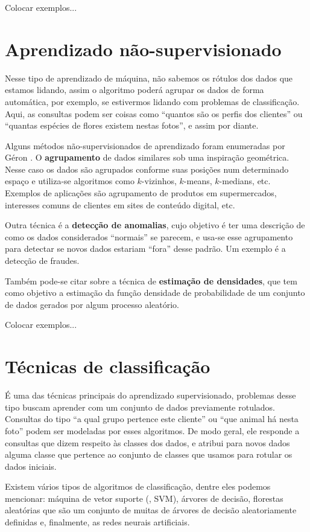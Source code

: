 Colocar exemplos...

\section{Aprendizado não-supervisionado}

Nesse tipo de aprendizado de máquina, não sabemos os rótulos dos dados que estamos lidando, assim o algoritmo poderá agrupar os dados de forma automática, por exemplo, se estivermos lidando com problemas de classificação. Aqui, as consultas podem ser coisas como ``quantos são os perfis dos clientes'' ou ``quantas espécies de flores existem nestas fotos'', e assim por diante.

Alguns métodos não-supervisionados de aprendizado foram enumeradas por Géron \citep{hands}. O \textbf{agrupamento} de dados similares sob uma inspiração geométrica. Nesse caso os dados são agrupados conforme suas posições num determinado espaço e utiliza-se algoritmos como $k$-vizinhos, $k$-means, $k$-medians, etc. Exemplos de aplicações são agrupamento de produtos em supermercados, interesses comuns de clientes em sites de conteúdo digital, etc.

Outra técnica é a \textbf{detecção de anomalias}, cujo objetivo é ter uma descrição de como os dados considerados ``normais'' se parecem, e usa-se esse agrupamento para detectar se novos dados estariam ``fora'' desse padrão. Um exemplo é a detecção de fraudes.

Também pode-se citar sobre a técnica de \textbf{estimação de densidades}, que tem como objetivo a estimação da função densidade de probabilidade de um conjunto de dados gerados por algum processo aleatório.

Colocar exemplos...

\section{Técnicas de classificação}

É uma das técnicas principais do aprendizado supervisionado, problemas desse tipo buscam aprender com um conjunto de dados previamente rotulados. Consultas do tipo ``a qual grupo pertence este cliente'' ou ``que animal há nesta foto'' podem ser modeladas por esses algoritmos. De modo geral, ele responde a consultas que dizem respeito às classes dos dados, e atribui para novos dados alguma classe que pertence ao conjunto de classes que usamos para rotular os dados iniciais.

Existem vários tipos de algoritmos de classificação, dentre eles podemos mencionar: máquina de vetor suporte (, SVM), árvores de decisão, florestas aleatórias que são um conjunto de muitas de árvores de decisão aleatoriamente definidas e, finalmente, as redes neurais artificiais.


